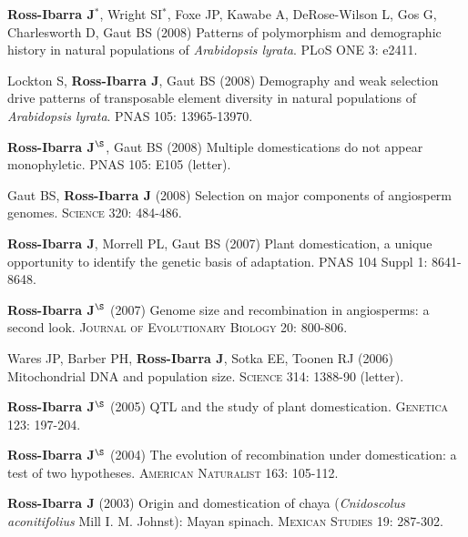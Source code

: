 \begin{etaremune}
\item {\bf Ross-Ibarra J}$^*$, Wright SI$^*$, Foxe JP, Kawabe A, DeRose-Wilson L, Gos G, Charlesworth D, Gaut BS (2008) Patterns of polymorphism and demographic history in natural populations of \emph{Arabidopsis lyrata}.  \textsc{PLoS ONE} 3: e2411.


\item Lockton S, {\bf Ross-Ibarra J}, Gaut BS (2008) Demography and weak selection drive patterns of transposable element diversity in natural populations of \emph{Arabidopsis lyrata}. PNAS 105: 13965-13970.


\item {\bf Ross-Ibarra J}$^\S$, Gaut BS (2008) Multiple domestications do not appear monophyletic. PNAS 105: E105 (letter).


\item Gaut BS, {\bf Ross-Ibarra J} (2008) Selection on major components of angiosperm genomes.  \textsc{Science} 320: 484-486.


\item {\bf Ross-Ibarra J}, Morrell PL, Gaut BS (2007) Plant domestication, a unique opportunity to identify the genetic basis of adaptation. PNAS 104 Suppl 1: 8641-8648.


\item {\bf Ross-Ibarra J}$^\S$ (2007) Genome size and recombination in angiosperms: a second look.  \textsc{Journal of Evolutionary Biology} 20: 800-806.


\item Wares JP, Barber PH, {\bf Ross-Ibarra J}, Sotka EE, Toonen RJ (2006) Mitochondrial DNA and population size.  \textsc{Science} 314: 1388-90 (letter).


\item {\bf Ross-Ibarra J}$^\S$ (2005) QTL and the study of plant domestication.  \textsc{Genetica} 123: 197-204.


\item {\bf Ross-Ibarra J}$^\S$ (2004) The evolution of recombination under domestication: a test of two hypotheses.  \textsc{American Naturalist} 163: 105-112.


\item {\bf Ross-Ibarra J} (2003) Origin and domestication of chaya (\emph{Cnidoscolus aconitifolius} Mill I. M. Johnst): Mayan spinach.  \textsc{Mexican Studies} 19: 287-302.



\end{etaremune}
